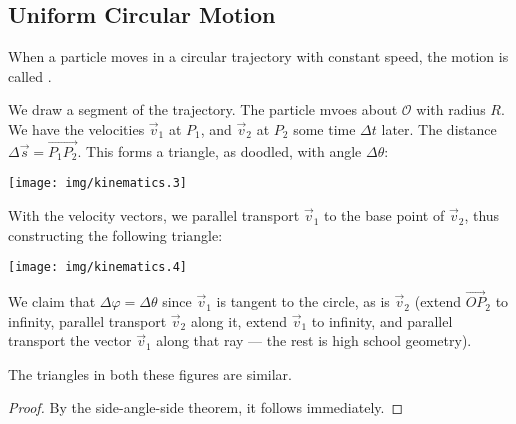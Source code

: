 \subsection{Uniform Circular Motion}

When a particle moves in a circular trajectory with constant speed, the
motion is called .

We draw a segment of the trajectory. The particle mvoes about
$\mathcal{O}$ with radius $R$. We have the velocities $\vec{v}_{1}$ at
$P_{1}$, and $\vec{v}_{2}$ at $P_{2}$ some time $\Delta t$ later. The
distance $\Delta\vec{s}=\overrightarrow{P_{1}P_{2}}$. This forms a triangle, as
doodled, with angle $\Delta\theta$:
\begin{center}
\texttt{[image: img/kinematics.3]}
\end{center}
With the velocity vectors, we parallel transport $\vec{v}_{1}$ to the
base point of $\vec{v}_{2}$, thus constructing the following triangle:
\begin{center}
\texttt{[image: img/kinematics.4]}
\end{center}
We claim that $\Delta\varphi=\Delta\theta$ since $\vec{v}_{1}$ is
tangent to the circle, as is $\vec{v}_{2}$ (extend
$\overrightarrow{OP}_{2}$ to infinity, parallel transport $\vec{v}_{2}$
along it, extend $\vec{v}_{1}$ to infinity, and parallel transport the
vector $\vec{v}_{1}$ along that ray --- the rest is high school geometry).

 The triangles in both these figures are similar.

\begin{proof}
By the side-angle-side theorem, it follows immediately.
\end{proof}


